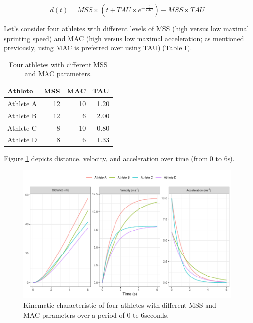 \documentclass[
]{jss}
\begin{document}
\begin{equation}
  d(t) = MSS \times (t + TAU \times e^{-\frac{t}{TAU}}) - MSS \times TAU  \label{eq:distance-time}
\end{equation}

Let's consider four athletes with different levels of MSS (high versus low maximal sprinting speed) and MAC (high versus low maximal acceleration; as mentioned previously, using MAC is preferred over using TAU) (Table \ref{tab:four-athletes-table}).

\begin{CodeChunk}
\begin{table}

\caption{\label{tab:four-athletes-table}Four athletes with different MSS and MAC parameters.}
\centering
\begin{tabular}[t]{l|r|r|r}
\hline
Athlete & MSS & MAC & TAU\\
\hline
Athlete A & 12 & 10 & 1.20\\
\hline
Athlete B & 12 & 6 & 2.00\\
\hline
Athlete C & 8 & 10 & 0.80\\
\hline
Athlete D & 8 & 6 & 1.33\\
\hline
\end{tabular}
\end{table}

\end{CodeChunk}

Figure \ref{fig:four-athletes-kinematics} depicts distance, velocity, and acceleration over time (from 0 to 6s).

\begin{CodeChunk}
\begin{figure}

{\centering \includegraphics[width=1\linewidth]{paper_files/figure-latex/four-athletes-kinematics-1} 

}

\caption[Kinematic characteristic of four athletes with different MSS and MAC parameters over a period of 0 to 6seconds]{Kinematic characteristic of four athletes with different MSS and MAC parameters over a period of 0 to 6seconds.}\label{fig:four-athletes-kinematics}
\end{figure}
\end{CodeChunk}
\end{document}
